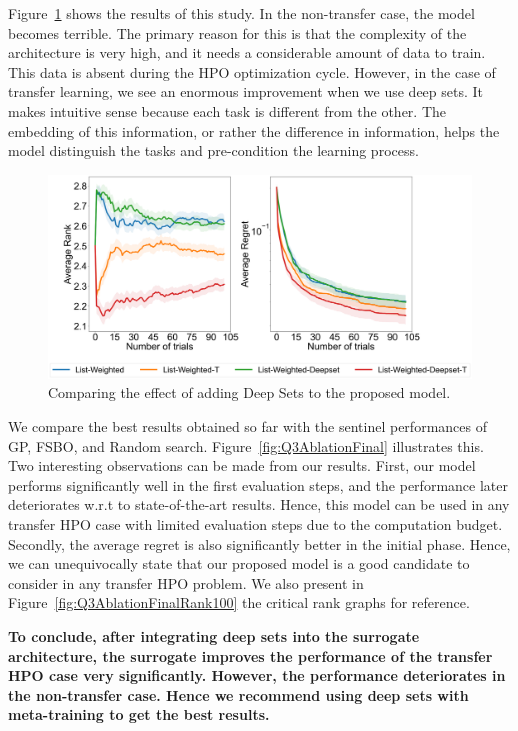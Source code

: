 \documentclass[12pt, twoside, ngerman]{report}
\begin{document}
Figure~\ref{fig:Q3Ablation} shows the results of this study. In the non-transfer case,  the model becomes terrible. The primary reason for this is that the complexity of the architecture is very high, and it needs a considerable amount of data to train. This data is absent during the HPO optimization cycle. However,  in the case of transfer learning,  we see an enormous improvement when we use deep sets. It makes intuitive sense because each task is different from the other. The embedding of this information, or rather the difference in information, helps the model distinguish the tasks and pre-condition the learning process. 

\begin{figure}[h]
  \centering
    \includegraphics[scale=0.25]{images/Q3Ablation}
    \caption{Comparing the effect of adding Deep Sets to the proposed model.}
    \label{fig:Q3Ablation}
\end{figure}

We compare the best results obtained so far with the sentinel performances of GP,  FSBO,  and Random search. Figure~\ref{fig:Q3AblationFinal} illustrates this.  Two interesting observations can be made from our results. First,  our model performs significantly well in the first evaluation steps, and the performance later deteriorates w.r.t to state-of-the-art results. Hence,  this model can be used in any transfer HPO case with limited evaluation steps due to the computation budget. Secondly,   the average regret is also significantly better in the initial phase. Hence, we can unequivocally state that our proposed model is a good candidate to consider in any transfer HPO problem. 
We also present in Figure~\ref{fig:Q3AblationFinalRank100} the critical rank graphs for reference.

\textbf{To conclude, after integrating deep sets into the surrogate architecture,  the surrogate improves the performance of the transfer HPO case very significantly. However, the performance deteriorates in the non-transfer case. Hence we recommend using deep sets with meta-training to get the best results.}
\end{document}
